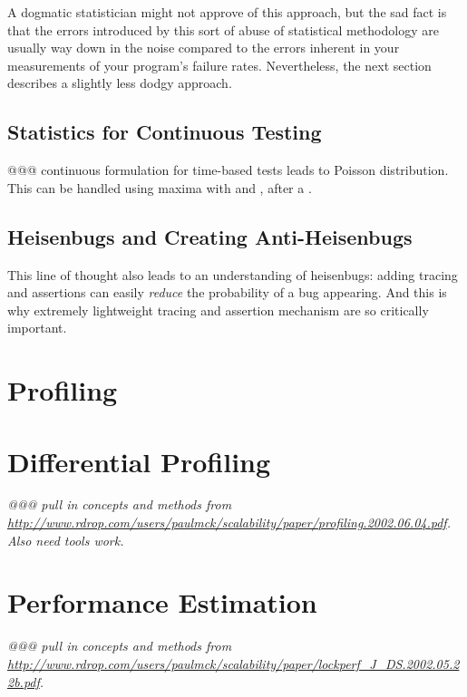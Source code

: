A dogmatic statistician might not approve of this approach, but the
sad fact is that the errors introduced by this sort of abuse of
statistical methodology are usually way down in the noise compared to the
errors inherent in your measurements of your program's failure rates.
Nevertheless, the next section describes a slightly less dodgy approach.

\subsection{Statistics for Continuous Testing}
\label{sec:Statistics for Continuous Testing}

@@@ continuous formulation for time-based tests leads to Poisson distribution.
This can be handled using maxima with  and
, after a .

\subsection{Heisenbugs and Creating Anti-Heisenbugs}
\label{Heisenbugs and Creating Anti-Heisenbugs}

This line of thought also leads to an understanding of heisenbugs:
adding tracing and assertions can easily \emph{reduce} the probability
of a bug appearing.
And this is why extremely lightweight tracing and assertion mechanism are
so critically important.

\section{Profiling}
\label{sec:analysis:Profiling}

\section{Differential Profiling}
\label{sec:analysis:Differential Profiling}

{\em @@@ pull in concepts and methods from
\url{http://www.rdrop.com/users/paulmck/scalability/paper/profiling.2002.06.04.pdf}.
Also need tools work.}

\section{Performance Estimation}
\label{sec:analysis:Performance Estimation}

{\em @@@ pull in concepts and methods from
\url{http://www.rdrop.com/users/paulmck/scalability/paper/lockperf_J_DS.2002.05.22b.pdf}.}
